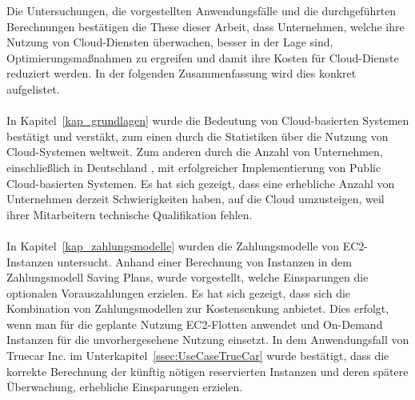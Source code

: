 Die Untersuchungen, die vorgestellten Anwendungsfälle und die durchgeführten Berechnungen bestätigen die These dieser Arbeit, dass Unternehmen, welche ihre Nutzung von Cloud-Diensten überwachen, besser in der Lage sind, Optimierungsmaßnahmen zu ergreifen und damit ihre Kosten für Cloud-Dienste reduziert werden. In der folgenden Zusammenfassung wird dies konkret aufgelistet.
\\\\
In Kapitel~\ref{kap_grundlagen} %
wurde die Bedeutung von Cloud-basierten Systemen bestätigt und verstäkt, zum einen durch die Statistiken %
über die Nutzung von Cloud-Systemen weltweit. Zum anderen durch die Anzahl von Unternehmen, einschließlich in Deutschland%
, mit erfolgreicher Implementierung von Public Cloud-basierten Systemen. Es hat sich gezeigt, dass eine erhebliche Anzahl von Unternehmen derzeit Schwierigkeiten haben, auf die Cloud umzusteigen, weil ihrer Mitarbeitern technische Qualifikation fehlen.
\\\\
In Kapitel~\ref{kap_zahlungsmodelle} wurden die Zahlungsmodelle von EC2-Instanzen untersucht. %
Anhand einer Berechnung von Instanzen in dem Zahlungsmodell Saving Plans, wurde vorgestellt, welche Einsparungen die optionalen Vorauszahlungen erzielen. Es hat sich gezeigt, dass sich die Kombination von Zahlungsmodellen zur Kostensenkung anbietet. Dies erfolgt, wenn man für die geplante Nutzung EC2-Flotten anwendet und On-Demand Instanzen für die unvorhergesehene Nutzung einsetzt. %
%
In dem Anwendungsfall von Truecar Inc. im Unterkapitel~\ref{ssec:UseCaseTrueCar} %
wurde bestätigt, dass die korrekte Berechnung der künftig nötigen reservierten Instanzen und deren spätere Überwachung, erhebliche Einsparungen erzielen.
\\\\
